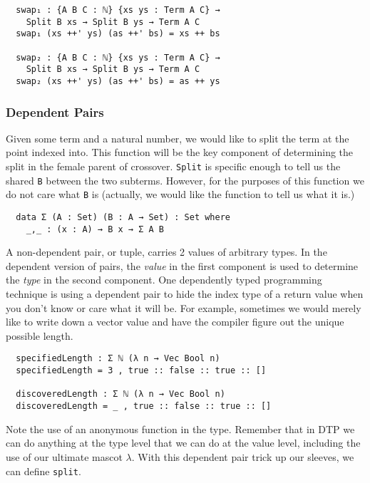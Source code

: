 \documentclass{acm_proc_article-sp}
\begin{document}
\begin{verbatim}
  swap₁ : {A B C : ℕ} {xs ys : Term A C} →
    Split B xs → Split B ys → Term A C
  swap₁ (xs ++' ys) (as ++' bs) = xs ++ bs

  swap₂ : {A B C : ℕ} {xs ys : Term A C} →
    Split B xs → Split B ys → Term A C
  swap₂ (xs ++' ys) (as ++' bs) = as ++ ys
\end{verbatim}

\subsubsection{Dependent Pairs}

Given some term and a natural number, we would like to split the term
at the point indexed into. This function will be the key component of
determining the split in the female parent of
crossover. \texttt{Split} is specific enough to tell us the shared
\texttt{B} between the two subterms. However, for the purposes of this
function we do not care what \texttt{B} is (actually, we would like
the function to tell us what it is.)

\begin{verbatim}
  data Σ (A : Set) (B : A → Set) : Set where
    _,_ : (x : A) → B x → Σ A B
\end{verbatim}

A non-dependent pair, or tuple, carries 2 values of arbitrary
types. In the dependent version of pairs, the \textit{value} in the first
component is used to determine the \textit{type} in the second
component. One dependently typed programming technique is using a
dependent pair to hide the index type of a return value when you don't
know or care what it will be. For example, sometimes we would merely
like to write down a vector value and have the compiler figure out the
unique possible length.

\begin{verbatim}
  specifiedLength : Σ ℕ (λ n → Vec Bool n)
  specifiedLength = 3 , true :: false :: true :: []

  discoveredLength : Σ ℕ (λ n → Vec Bool n)
  discoveredLength = _ , true :: false :: true :: []
\end{verbatim}

Note the use of an anonymous function in the type. Remember that in DTP
we can do anything at the type level that we can do at the value
level, including the use of our ultimate mascot $\lambda$. With this
dependent pair trick up our sleeves, we can define \texttt{split}.
\end{document}
